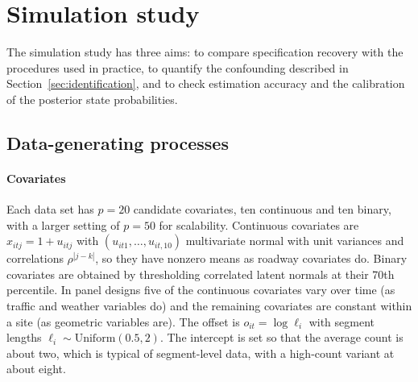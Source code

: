 \section{Simulation study}\label{sec:simulation}

The simulation study has three aims: to compare specification recovery with the procedures used in practice, to quantify the confounding described in Section~\ref{sec:identification}, and to check estimation accuracy and the calibration of the posterior state probabilities.

\subsection{Data-generating processes}

\paragraph{Covariates} Each data set has $p=20$ candidate covariates, ten continuous and ten binary, with a larger setting of $p=50$ for scalability. Continuous covariates are $x_{itj}=1+u_{itj}$ with $(u_{it1},\dots,u_{it,10})$ multivariate normal with unit variances and correlations $\rho^{|j-k|}$, so they have nonzero means as roadway covariates do. Binary covariates are obtained by thresholding correlated latent normals at their 70th percentile. In panel designs five of the continuous covariates vary over time (as traffic and weather variables do) and the remaining covariates are constant within a site (as geometric variables are). The offset is $o_{it}=\log\ell_i$ with segment lengths $\ell_i\sim\mathrm{Uniform}(0.5,2)$. The intercept is set so that the average count is about two, which is typical of segment-level data, with a high-count variant at about eight.

